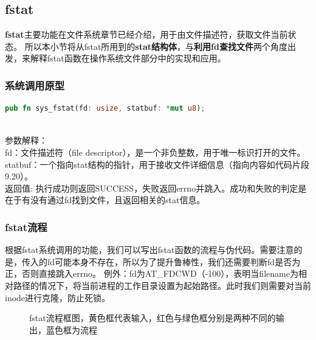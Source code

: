 
\subsection{fstat}


\textbf{fstat}主要功能在文件系统章节已经介绍，用于由文件描述符，获取文件当前状态。
所以本小节将从fstat所用到的\textbf{stat结构体}，与\textbf{利用fd查找文件}两个角度出发，来解释fstat函数在操作系统文件部分中的实现和应用。\\

\subsubsection{系统调用原型}
\begin{lstlisting}[language={Rust}, 
	caption={os/src/syscall/fs.rs}]
    pub fn sys_fstat(fd: usize, statbuf: *mut u8);
\end{lstlisting}
\\
参数解释：\\
fd：文件描述符（file descriptor），是一个非负整数，用于唯一标识打开的文件。\\
statbuf：一个指向stat结构的指针，用于接收文件详细信息（指向内容如代码片段9.20）。\\
返回值: 执行成功则返回SUCCESS，失败返回errno并跳入。成功和失败的判定是在于有没有通过fd找到文件，且返回相关的stat信息。\\

\subsubsection{fstat流程}
根据fstat系统调用的功能，我们可以写出fstat函数的流程与伪代码。需要注意的是，传入的fd可能本身不存在，所以为了提升鲁棒性，我们还需要判断fd是否为正，否则直接跳入errno。
例外：fd为AT_FDCWD（-100），表明当filename为相对路径的情况下，将当前进程的工作目录设置为起始路径。此时我们则需要对当前inode进行克隆，防止死锁。
\begin{figure}[H]
    \centering
    \caption{fstat流程框图，黄色框代表输入，红色与绿色框分别是两种不同的输出，蓝色框为流程}
\end{figure}


